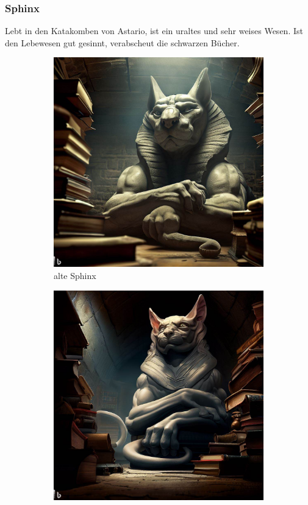 \documentclass[11pt, twoside]{article}
\begin{document}
\subsubsection{Sphinx\label{sphinx}}
\label{sec:org7197f40}
Lebt in den Katakomben von Astario, ist ein uraltes und sehr weises Wesen. Ist den Lebewesen gut gesinnt, verabscheut die schwarzen Bücher.
\begin{figure}[H]
\centering
\caption{Sphinx}
\label{fig:sphinx}
  \begin{subfigure}{0.3\textwidth}
    \centering
    \includegraphics[width=0.99\linewidth]{sphinx1.jpeg}
    \caption{alte Sphinx}
  \end{subfigure}%
  \begin{subfigure}{0.3\textwidth}
    \centering
    \includegraphics[width=0.99\linewidth]{sphinx2.jpeg}

\end{subfigure}
\end{figure}
\end{document}
